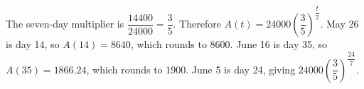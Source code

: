 The seven-day multiplier is $\dfrac{14400}{24000}=\dfrac{3}{5}$. Therefore $A(t)=24000\left(\dfrac{3}{5}\right)^{\dfrac{t}{7}}$. May 26 is day 14, so $A(14)=8640$, which rounds to $\boxed{8600}$. June 16 is day 35, so $A(35)=1866.24$, which rounds to $\boxed{1900}$. June 5 is day 24, giving $\boxed{24000\left(\dfrac{3}{5}\right)^{\dfrac{24}{7}}}$.
